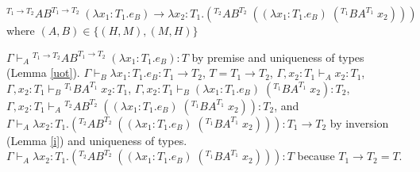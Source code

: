 \begin{case}
$^{T_{1}\rightarrow T_{2}}AB^{T_{1}\rightarrow T_{2}}\;(\lambda x_{1}:T_{1}.e_{B})\rightarrow\lambda x_{2}:T_{1}.(^{T_{2}}AB^{T_{2}}\;((\lambda x_{1}:T_{1}.e_{B})\;(^{T_{1}}BA^{T_{1}}\;x_{2})))$ where $(A,B)\in\lbrace(H,M),(M,H)\rbrace$

$\Gamma\vdash_{A}{^{T_{1}\rightarrow T_{2}}}AB^{T_{1}\rightarrow T_{2}}\;(\lambda x_{1}:T_{1}.e_{B}):T$ by premise and uniqueness of types (Lemma \ref{uot}).  $\Gamma\vdash_{B}\lambda x_{1}:T_{1}.e_{B}:T_{1}\rightarrow T_{2}$, $T=T_{1}\rightarrow T_{2}$, $\Gamma,x_{2}:T_{1}\vdash_{A}x_{2}:T_{1}$, $\Gamma,x_{2}:T_{1}\vdash_{B}{^{T_{1}}B}A^{T_{1}}\;x_{2}:T_{1}$, $\Gamma,x_{2}:T_{1}\vdash_{B}(\lambda x_{1}:T_{1}.e_{B})\;(^{T_{1}}BA^{T_{1}}\;x_{2}):T_{2}$, $\Gamma,x_{2}:T_{1}\vdash_{A}{^{T_{2}}A}B^{T_{2}}\;((\lambda x_{1}:T_{1}.e_{B})\;(^{T_{1}}BA^{T_{1}}\;x_{2})):T_{2}$, and $\Gamma\vdash_{A}\lambda x_{2}:T_{1}.(^{T_{2}}AB^{T_{2}}\;((\lambda x_{1}:T_{1}.e_{B})\;(^{T_{1}}BA^{T_{1}}\;x_{2}))):T_{1}\rightarrow T_{2}$ by inversion (Lemma \ref{i}) and uniqueness of types.  $\Gamma\vdash_{A}\lambda x_{2}:T_{1}.(^{T_{2}}AB^{T_{2}}\;((\lambda x_{1}:T_{1}.e_{B})\;(^{T_{1}}BA^{T_{1}}\;x_{2}))):T$ because $T_{1}\rightarrow T_{2}=T$.
\end{case}